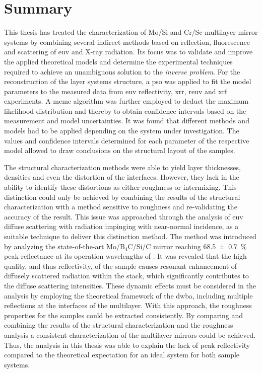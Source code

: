 \glsresetall
\chapter{Summary} \label{ch_summary}
This thesis has treated the characterization of Mo/Si and Cr/Sc multilayer mirror
systems by combining several indirect methods based on reflection, fluorescence
and scattering of \gls{euv} and X-ray radiation.
Its focus was to validate and improve the applied theoretical models and
determine the experimental techniques required to achieve an unambiguous
solution to the \emph{inverse problem}.
For the reconstruction of the layer systems structure, a \gls{pso} was applied
to fit the model parameters to the measured data from \gls{euv} reflectivity,
\gls{xrr}, \gls{reuv} and \gls{xrf} experiments.
A \gls{mcmc} algorithm was further employed to deduct the maximum likelihood
distribution and thereby to obtain confidence intervals based on the measurement
and model uncertainties.
It was found that different methods and models had to be applied depending on
the system under investigation.
The values and confidence intervals determined for each parameter of the
respective model allowed to draw conclusions on the structural layout of the
samples.

The structural characterization methods were able to yield layer thicknesses,
densities and even the distortion of the interfaces.
However, they lack in the ability to identify these distortions as either
roughness or intermixing.
This distinction could only be achieved by combining the results of the
structural characterization with a method sensitive to roughness and
re-validating the accuracy of the result.
This issue was approached through the analysis of \gls{euv} diffuse scattering
with radiation impinging with near-normal incidence, as a suitable technique to
deliver this distinction method.
The method was introduced by analyzing the state-of-the-art Mo/B$_4$C/Si/C
mirror reaching \SI{68.5 \pm 0.7}{\percent} peak reflectance at its operation
wavelengths of .
It was revealed that the high quality, and thus reflectivity, of the sample
causes resonant enhancement of diffusely scattered radiation within the stack,
which significantly contributes to the diffuse scattering intensities.
These dynamic effects must be considered in the analysis by employing the
theoretical framework of the \gls{dwba}, including multiple reflections at the
interfaces of the multilayer.
With this approach, the roughness properties for the samples could be extracted
consistently.
By comparing and combining the results of the structural characterization and
the roughness analysis a consistent characterization of the multilayer mirrors
could be achieved.
Thus, the analysis in this thesis was able to explain the lack of peak
reflectivity compared to the theoretical expectation for an ideal system for
both sample systems.

